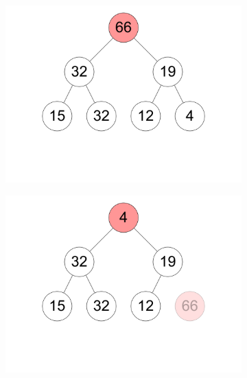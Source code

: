 \documentclass[11pt,a4paper]{article}
\begin{document}
\begin{loesung}
\begin{enumerate}
\begin{figure}[h!]
\begin{subfigure}[b]{0.23\textwidth}
                \includegraphics[width=\textwidth]{img/b6}
            \end{subfigure}
            \begin{subfigure}[b]{0.23\textwidth}
                \centering
                \includegraphics[width=\textwidth]{img/b7}
            \end{subfigure}
            \begin{subfigure}[b]{0.23\textwidth}
                \centering

\end{subfigure}
\end{figure}
\end{enumerate}
\end{loesung}
\end{document}
